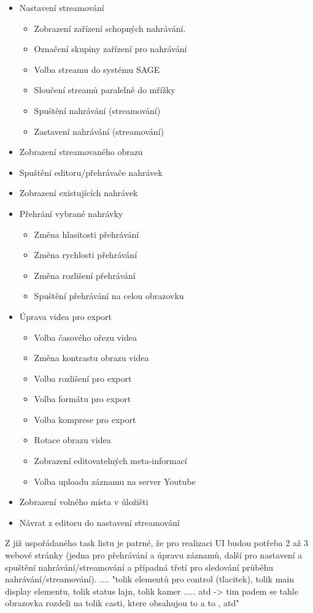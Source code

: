 \documentclass[thesis=M,czech]{FITthesis}[2012/06/26]
\begin{document}
\begin{itemize}
 \item Nastavení streamování
   \begin{itemize}
	 \item Zobrazení zařízení schopných nahrávání.
	 \item Označení skupiny zařízení pro nahrávání
	 \item Volba streamu do systému SAGE
	 \item Sloučení streamů paralelně do mřížky
	 \item Spuštění nahrávání (streamování)
	 \item Zastavení nahrávání (streamování)
   \end{itemize}
 \item Zobrazení streamovaného obrazu
 \item Spuštění editoru/přehrávače nahrávek
 \item Zobrazení existujících nahrávek
 \item Přehrání vybrané nahrávky
   \begin{itemize}
 	 \item Změna hlasitosti přehrávání
	 \item Změna rychlosti přehrávání
	 \item Změna rozlišení přehrávání
 	 \item Spuštění přehrávání na celou obrazovku
   \end{itemize}
 \item Úprava videa pro export
   \begin{itemize}
	 \item Volba časového ořezu videa 
     \item Změna kontrastu obrazu videa
  	 \item Volba rozlišení pro export
  	 \item Volba formátu pro export
	 \item Volba komprese pro export
	 \item Rotace obrazu videa
	 \item Zobrazení editovatelných meta-informací
	 \item Volba uploadu záznamu na server Youtube
   \end{itemize}
 \item Zobrazení volného místa v úložišti
 \item Návrat z editoru do nastavení streamování
\end{itemize}

Z již uspořádaného task listu je patrné, že pro realizaci UI budou potřeba 2 až 3 webové stránky (jedna pro přehrávání a úpravu záznamů, další pro nastavení a spuštění nahrávání/streamování a případná třetí pro sledování průběhu nahrávání/streamování).
 .... "tolik elementů pro control (tlacitek), tolik main display elementu, tolik status lajn, tolik kamer ..... atd -> tim padem se tahle obrazovka rozdeli na tolik casti, ktere obsahujou to a to , atd"
\end{document}
